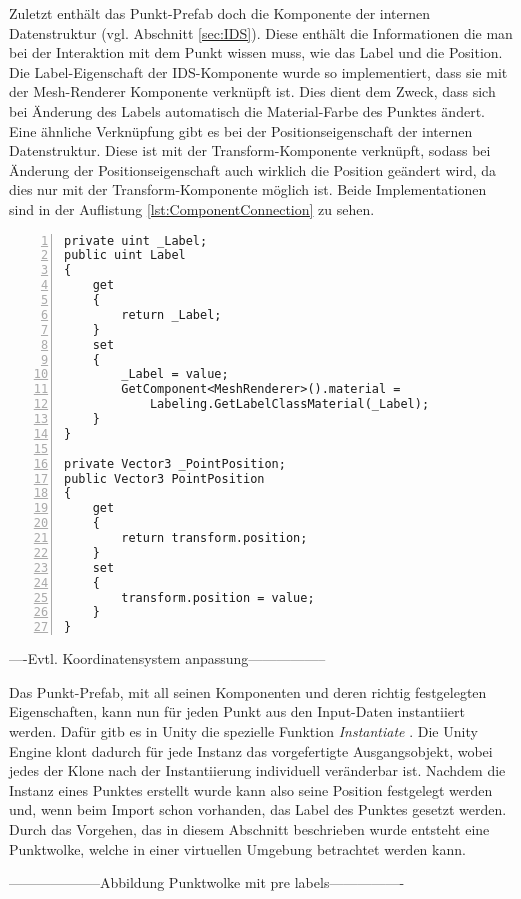 Zuletzt enthält das Punkt-Prefab doch die Komponente der internen Datenstruktur (vgl. Abschnitt \ref{sec:IDS}). Diese enthält die Informationen die man bei der Interaktion mit dem Punkt wissen muss, wie das Label und die Position. Die Label-Eigenschaft der IDS-Komponente wurde so implementiert, dass sie mit der Mesh-Renderer Komponente verknüpft ist. Dies dient dem Zweck, dass sich bei Änderung des Labels automatisch die Material-Farbe des Punktes ändert. Eine ähnliche Verknüpfung gibt es bei der Positionseigenschaft der internen Datenstruktur. Diese ist mit der Transform-Komponente verknüpft, sodass bei Änderung der Positionseigenschaft auch wirklich die Position geändert wird, da dies nur mit der Transform-Komponente möglich ist. Beide Implementationen sind in der Auflistung \ref{lst:ComponentConnection} zu sehen.

\begin{lstlisting}[caption={Verknupfung von Label- und Positionseigenschaft der IDS-Komponente mit anderen Komponenten}, captionpos=t,numbers=left , label=lst:ComponentConnection]
private uint _Label;
public uint Label
{
    get
    {
        return _Label;
    }
    set
    {
        _Label = value;
        GetComponent<MeshRenderer>().material = 
        	Labeling.GetLabelClassMaterial(_Label);
    }
}

private Vector3 _PointPosition;
public Vector3 PointPosition
{
    get
    {
        return transform.position;
    }
    set
    {
        transform.position = value;
    }
}
\end{lstlisting}
\quad

----Evtl. Koordinatensystem anpassung-----------------

Das Punkt-Prefab, mit all seinen Komponenten und deren richtig festgelegten Eigenschaften, kann nun für jeden Punkt aus den Input-Daten instantiiert werden. Dafür gitb es in Unity die spezielle Funktion \textit{Instantiate} \cite{bib:Instantiate}. Die Unity Engine klont dadurch für jede Instanz das vorgefertigte Ausgangsobjekt, wobei jedes der Klone nach der Instantiierung individuell veränderbar ist. Nachdem die Instanz eines Punktes erstellt wurde kann also seine Position festgelegt werden und, wenn beim Import schon vorhanden, das Label des Punktes gesetzt werden. Durch das Vorgehen, das in diesem Abschnitt beschrieben wurde entsteht eine Punktwolke, welche in einer virtuellen Umgebung betrachtet werden kann. 

--------------------Abbildung Punktwolke mit pre labels----------------


